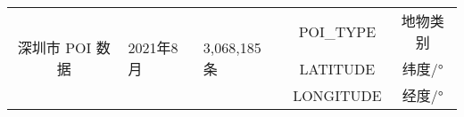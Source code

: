 \begin{table}[H]
\begin{tabular}{@{}ccccc@{}}
\multirow{3}{*}{深圳市 POI 数据} & \multicolumn{1}{l}{\multirow{3}{*}{2021年8月}}                                             & \multicolumn{1}{l}{\multirow{3}{*}{3,068,185 条}} & POI\_TYPE     & 地物类别  \\
                               & \multicolumn{1}{l}{}                                                                     & \multicolumn{1}{l}{}                             & LATITUDE      & 纬度/°     \\
                               & \multicolumn{1}{l}{}                                                                     & \multicolumn{1}{l}{}                             & LONGITUDE     & 经度/°     \\ \bottomrule
\end{tabular}
\end{table}